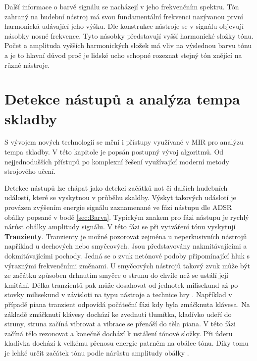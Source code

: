   Další informace o barvě signálu se nacházejí v jeho frekvenčním spektru. 
  Tón zahraný na hudební nástroj má svou fundamentální  frekvenci nazývanou první harmonická udávající jeho výšku.
  Dle konstrukce nástroje se v signálu objevují násobky nosné frekvence.
  Tyto násobky představují vyšší harmonické složky tónu.
  Počet a amplituda vyšších harmonických složek má vliv na výslednou barvu tónu a je to hlavní důvod proč je lidské ucho schopné rozeznat stejný tón znějící na různé nástroje. %


\section{Detekce nástupů a analýza tempa skladby} \label{sec:Detekce_tempa}
S vývojem nových technologií se mění i přístupy využívané v \acs{MIR} pro analýzu tempa skladby. 
V této kapitole je popsán postupný vývoj algoritmů.
Od nejjednodušších přístupů po komplexní řešení využívající moderní metody strojového učení.

Detekce nástupů lze chápat jako detekci začátků not či dalších hudebních událostí, které se vyskytnou v průběhu skaldby.
Výskyt takových udáslotí je provázen zvýšením energie signálu zaznamenané ve fázi nástupu dle ADSR obálky popsané v bodě \ref{sec:Barva}.
Typickým znakem pro fázi nástupu je rychlý nárůst obálky amplitudy signálu.
V této fázi se při vytváření tónu vyskytují \textbf{Tranzienty}. Tranzienty je možné pozorovat zejména u neperkusivních nástrojů například u dechových nebo smyčcových.
Jsou představovány nakmitávajícími a dokmitávajícími pochody. Jedná se o zvuk netónové podoby připomínající hluk s výraznými frekvenčními změnami.
U smyčcových nástrojů takový zvuk může být ze začátku způsoben drhnutím smyčce o strunu do chvíle než se ustálí její kmitání. Délka tranzientů pak může dosahovat od jednotek milisekund až po stovky milisekund v závisloti na typu nástroje a technice hry \cite{syrový2013hudební}.
Například v případě piana tranzient odpovídá počáteční fázi kdy byla zmáčknuta klávesa.
Na základě zmáčknutí klávesy dochází ke zvednutí tlumítka, kladívko udeří do struny, struna začíná vibrovat a vibrace se přenáší do těla piana.
V této fázi začíná tělo rezonovat a konečně dochází k ustálení tónové složky. Při úderu kladívka dochází k velkému přenosu energie patrném na obálce tónu. Díky tomu je lehké určit začátek tónu podle nárůstu amplitudy obálky \cite{fundamental_of_music_processing}.

